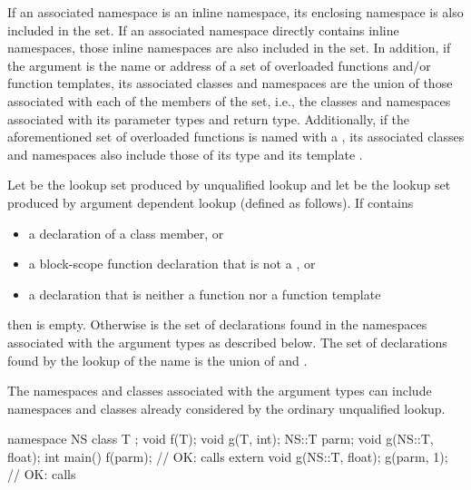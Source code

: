 If an associated namespace is an inline namespace, its
enclosing namespace is also included in the set. If an associated namespace
directly contains inline namespaces, those inline namespaces are also included
in the set.
In addition, if the argument is the name or address of a set of
overloaded functions and/or function templates, its associated classes
and namespaces are the union of those associated with each of the
members of the set, i.e., the classes and namespaces associated with its
parameter types and return type.
Additionally, if the aforementioned set of overloaded functions is named with
a , its associated classes and namespaces also include
those of its type  and its template
.

\pnum
Let  be the lookup set produced by unqualified
lookup and let  be the lookup set produced
by argument dependent lookup (defined as follows). If  contains
\begin{itemize}
\item a declaration of a class member, or
\item a block-scope function declaration that is not a , or
\item a declaration that is neither a function nor a function template
\end{itemize}
then  is empty. Otherwise  is the set of declarations
found in the namespaces associated with the argument types as described
below. The set of declarations found by the lookup of the name is the
union of  and . \begin{note} The namespaces and classes
associated with the argument types can include namespaces and classes
already considered by the ordinary unqualified lookup. \end{note}
\begin{example}

\begin{codeblock}
namespace NS {
  class T { };
  void f(T);
  void g(T, int);
}
NS::T parm;
void g(NS::T, float);
int main() {
  f(parm);                      // OK: calls 
  extern void g(NS::T, float);
  g(parm, 1);                   // OK: calls 
}
\end{codeblock}
\end{example}

